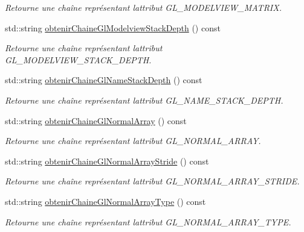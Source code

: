 \begin{DoxyCompactItemize}
\begin{DoxyCompactList}\small\item\em Retourne une chaîne représentant l\textquotesingle{}attribut G\+L\+\_\+\+M\+O\+D\+E\+L\+V\+I\+E\+W\+\_\+\+M\+A\+T\+R\+I\+X. \end{DoxyCompactList}\item 
std\+::string \hyperlink{group__utilitaire_ga745672a8704edbf33daef5314f9cdfaf}{obtenir\+Chaine\+Gl\+Modelview\+Stack\+Depth} () const 
\begin{DoxyCompactList}\small\item\em Retourne une chaîne représentant l\textquotesingle{}attribut G\+L\+\_\+\+M\+O\+D\+E\+L\+V\+I\+E\+W\+\_\+\+S\+T\+A\+C\+K\+\_\+\+D\+E\+P\+T\+H. \end{DoxyCompactList}\item 
std\+::string \hyperlink{group__utilitaire_ga04c7aa5d2e684fa0029e53b8c3b2cda8}{obtenir\+Chaine\+Gl\+Name\+Stack\+Depth} () const 
\begin{DoxyCompactList}\small\item\em Retourne une chaîne représentant l\textquotesingle{}attribut G\+L\+\_\+\+N\+A\+M\+E\+\_\+\+S\+T\+A\+C\+K\+\_\+\+D\+E\+P\+T\+H. \end{DoxyCompactList}\item 
std\+::string \hyperlink{group__utilitaire_gaa71b4ce64f1a5f86f8822904e51b549f}{obtenir\+Chaine\+Gl\+Normal\+Array} () const 
\begin{DoxyCompactList}\small\item\em Retourne une chaîne représentant l\textquotesingle{}attribut G\+L\+\_\+\+N\+O\+R\+M\+A\+L\+\_\+\+A\+R\+R\+A\+Y. \end{DoxyCompactList}\item 
std\+::string \hyperlink{group__utilitaire_ga9388bcac733bb55d8bff349828b9d86d}{obtenir\+Chaine\+Gl\+Normal\+Array\+Stride} () const 
\begin{DoxyCompactList}\small\item\em Retourne une chaîne représentant l\textquotesingle{}attribut G\+L\+\_\+\+N\+O\+R\+M\+A\+L\+\_\+\+A\+R\+R\+A\+Y\+\_\+\+S\+T\+R\+I\+D\+E. \end{DoxyCompactList}\item 
std\+::string \hyperlink{group__utilitaire_gac2ac905eb6421d2ff8edb736557f40e5}{obtenir\+Chaine\+Gl\+Normal\+Array\+Type} () const 
\begin{DoxyCompactList}\small\item\em Retourne une chaîne représentant l\textquotesingle{}attribut G\+L\+\_\+\+N\+O\+R\+M\+A\+L\+\_\+\+A\+R\+R\+A\+Y\+\_\+\+T\+Y\+P\+E. \end{DoxyCompactList}\item 

\end{DoxyCompactItemize}
